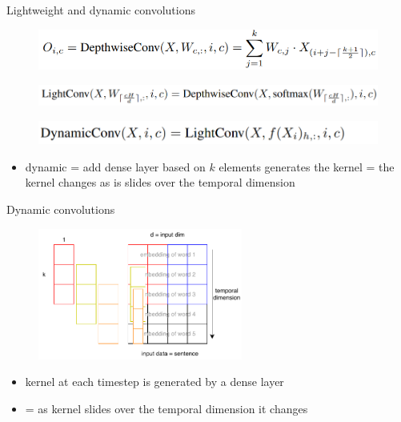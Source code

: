 \documentclass{beamer}
\begin{document}
\begin{frame}{Lightweight and dynamic convolutions}

\begin{figure}[h]
\includegraphics[width=1.0\textwidth]{img/depthwise_math}
\end{figure}

\begin{figure}[h]
\includegraphics[width=1.0\textwidth]{img/light_math}
\end{figure}

\begin{figure}[h]
\includegraphics[width=1.0\textwidth]{img/dynamic_conv_math}
\end{figure}

\begin{itemize}
\item dynamic = add dense layer based on $k$ elements generates the kernel = the kernel changes as is slides over the temporal dimension
\end{itemize}

\end{frame}
\begin{frame}{Dynamic convolutions}

\begin{figure}[h]
\includegraphics[width=0.6\textwidth]{img/dynamic_conv}
\end{figure}

\begin{itemize}
\item kernel at each timestep is generated by a dense layer
\item = as kernel slides over the temporal dimension it changes
\end{itemize}

\end{frame}
\end{document}
